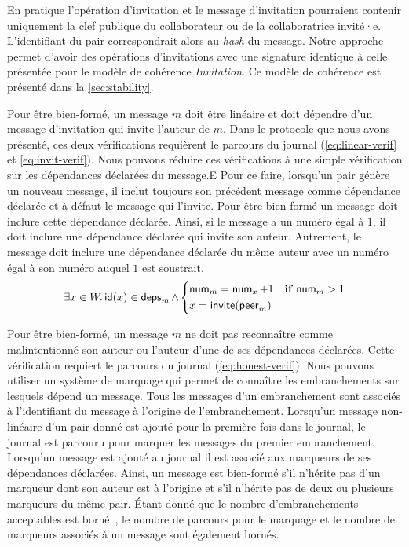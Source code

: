 En pratique l'opération d'invitation et le message d'invitation pourraient contenir uniquement la clef publique du collaborateur ou de la collaboratrice invité·e.
L'identifiant du pair correspondrait alors au \emph{hash} du message.
Notre approche permet d'avoir des opérations d'invitations avec une signature identique à celle présentée pour le modèle de cohérence \emph{Invitation}.
Ce modèle de cohérence est présenté dans la \autoref{sec:stability}.

Pour être bien-formé, un message $m$ doit être linéaire et doit dépendre d'un message d'invitation qui invite l'auteur de $m$.
Dans le protocole que nous avons présenté, ces deux vérifications requièrent le parcours du journal (\autoref{eq:linear-verif} et \autoref{eq:invit-verif}).
Nous pouvons réduire ces vérifications à une simple vérification sur les dépendances déclarées du message.E
Pour ce faire, lorsqu'un pair génère un nouveau message, il inclut toujours son précédent message comme dépendance déclarée et à défaut le message qui l'invite.
Pour être bien-formé un message doit inclure cette dépendance déclarée.
Ainsi, si le message a un numéro égal à $1$, il doit inclure une dépendance déclarée qui invite son auteur.
Autrement, le message doit inclure une dépendance déclarée du même auteur avec un numéro égal à son numéro auquel $1$ est soustrait.
%
\begin{equation}
    \exists x \in W \ldotp \operatorname{\mathsf{id}}(x) \in \operatorname{\mathsf{deps}}_m \land \begin{dcases}
    \operatorname{\mathsf{num}}_m = \operatorname{\mathsf{num}}_x + 1 & \mathrel{\mathbf{if}} \operatorname{\mathsf{num}}_m > 1\\
    x = \operatorname{\mathsf{invite}}(\operatorname{\mathsf{peer}}_m)
    \end{dcases}
\end{equation}

Pour être bien-formé, un message $m$ ne doit pas reconnaître comme malintentionné son auteur ou l'auteur d'une de ses dépendances déclarées.
Cette vérification requiert le parcours du journal (\autoref{eq:honest-verif}).
Nous pouvons utiliser un système de marquage qui permet de connaître les embranchements sur lesquels dépend un message.
Tous les messages d'un embranchement sont associés à l'identifiant du message à l'origine de l'embranchement.
Lorsqu'un message non-linéaire d'un pair donné est ajouté pour la première fois dans le journal, le journal est parcouru pour marquer les messages du premier embranchement.
Lorsqu'un message est ajouté au journal il est associé aux marqueurs de ses dépendances déclarées.
Ainsi, un message est bien-formé s'il n'hérite pas d'un marqueur dont son auteur est à l'origine et s'il n'hérite pas de deux ou plusieurs marqueurs du même pair.
Étant donné que le nombre d'embranchements acceptables est borné~\autocite{mahajan_2011_cac}, le nombre de parcours pour le marquage et le nombre de marqueurs associés à un message sont également bornés.

